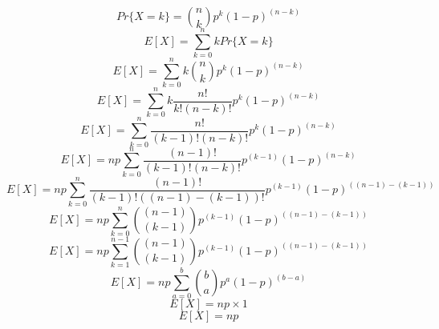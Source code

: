\documentclass{article}
\begin{document}
	\begin{equation}
	Pr\{X = k\} = {n \choose k} p^k (1 - p)^{(n - k)}
	\end{equation}
	\begin{equation}
	E[X] = \sum_{k = 0}^{n} k Pr\{X = k\}
	\end{equation}
	\begin{equation}
	E[X] = \sum_{k = 0}^{n} k {n \choose k} p^k (1 - p)^{(n - k)}
	\end{equation}
	\begin{equation}
	E[X] = \sum_{k = 0}^{n} k \frac{n!}{k!(n - k)!} p^k (1 - p)^{(n - k)}
	\end{equation}
	\begin{equation}
	E[X] = \sum_{k = 0}^{n} \frac{n!}{(k - 1)!(n - k)!} p^k (1 - p)^{(n - k)}
	\end{equation}
	\begin{equation}
	E[X] = np \sum_{k = 0}^{n} \frac{(n - 1)!}{(k - 1)!(n - k)!} p^{(k - 1)} (1 - p)^{(n - k)}
	\end{equation}
	\begin{equation}
	E[X] = np \sum_{k = 0}^{n} \frac{(n - 1)!}{(k - 1)!((n - 1) - (k - 1))!} p^{(k - 1)} (1 - p)^{((n - 1) - (k - 1))}
	\end{equation}
	\begin{equation}
	E[X] = np \sum_{k = 0}^{n} {(n - 1) \choose (k - 1)} p^{(k - 1)} (1 - p)^{((n - 1) - (k - 1))}
	\end{equation}
	\begin{equation}
	E[X] = np \sum_{k = 1}^{n - 1} {(n - 1) \choose (k - 1)} p^{(k - 1)} (1 - p)^{((n - 1) - (k - 1))}
	\end{equation}
	\begin{equation}
	E[X] = np \sum_{a = 0}^{b} {b \choose a} p^{a} (1 - p)^{(b - a)}
	\end{equation}
	\begin{equation}
	E[X] = np \times 1
	\end{equation}
	\begin{equation}
	E[X] = np
	\end{equation}
\end{document}
